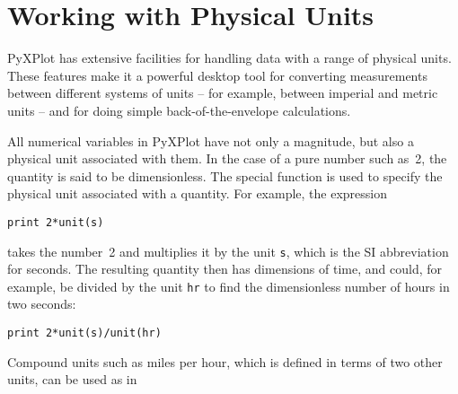 \vspace{3mm}
\newline
{}\newline
{}\newline
{}\newline
{}\newline
{}\newline
{}\newline
{}
\vspace{3mm}

\section{Working with Physical Units}
\label{sec:units}

PyXPlot has extensive facilities for handling data with a range of physical
units. These features make it a powerful desktop tool for converting
measurements between different systems of units -- for example, between
imperial and metric units -- and for doing simple back-of-the-envelope
calculations.

All numerical variables in PyXPlot have not only a magnitude, but also a
physical unit associated with them. In the case of a pure number such as~2, the
quantity is said to be dimensionless. The special function  is
used to specify the physical unit associated with a quantity. For example, the
expression

\begin{verbatim}
print 2*unit(s)
\end{verbatim}

\noindent takes the number~2 and multiplies it by the unit {\tt s}, which is
the SI abbreviation for seconds.  The resulting quantity then has dimensions of
time, and could, for example, be divided by the unit {\tt hr} to find the
dimensionless number of hours in two seconds:

\begin{verbatim}
print 2*unit(s)/unit(hr)
\end{verbatim}

Compound units such as miles per hour, which is defined in terms of two other
units, can be used as in

